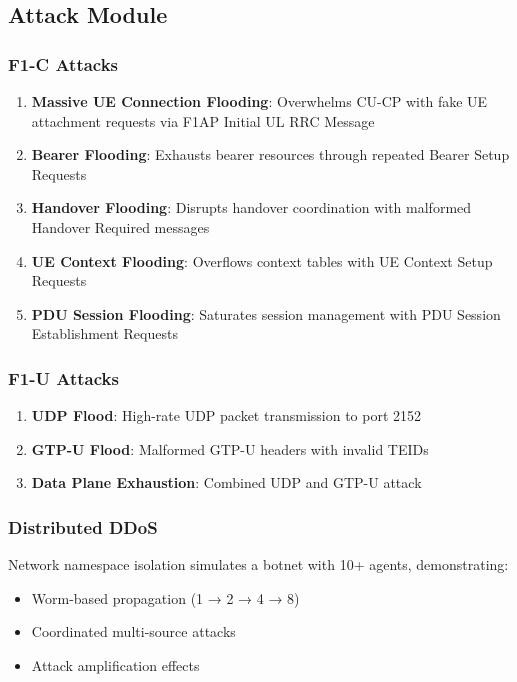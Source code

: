 \documentclass[conference]{IEEEtran}
\begin{document}
\subsection{Attack Module}

\subsubsection{F1-C Attacks}
\begin{enumerate}
    \item \textbf{Massive UE Connection Flooding}: Overwhelms CU-CP with fake UE attachment requests via F1AP Initial UL RRC Message
    \item \textbf{Bearer Flooding}: Exhausts bearer resources through repeated Bearer Setup Requests
    \item \textbf{Handover Flooding}: Disrupts handover coordination with malformed Handover Required messages
    \item \textbf{UE Context Flooding}: Overflows context tables with UE Context Setup Requests
    \item \textbf{PDU Session Flooding}: Saturates session management with PDU Session Establishment Requests
\end{enumerate}

\subsubsection{F1-U Attacks}
\begin{enumerate}
    \item \textbf{UDP Flood}: High-rate UDP packet transmission to port 2152
    \item \textbf{GTP-U Flood}: Malformed GTP-U headers with invalid TEIDs
    \item \textbf{Data Plane Exhaustion}: Combined UDP and GTP-U attack
\end{enumerate}

\subsubsection{Distributed DDoS}
Network namespace isolation simulates a botnet with 10+ agents, demonstrating:
\begin{itemize}
    \item Worm-based propagation (1 → 2 → 4 → 8)
    \item Coordinated multi-source attacks
    \item Attack amplification effects
\end{itemize}
\end{document}
